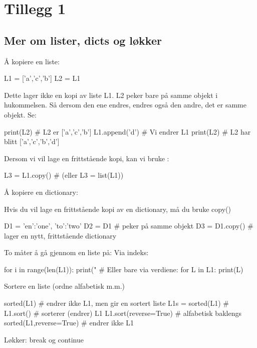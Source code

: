 \chapter{Tillegg 1}

\section{Mer om lister, dicts og løkker}

Å kopiere en liste:

\begin{usncodebox}
L1 = ['a','c','b']
L2 = L1
\end{usncodebox}

Dette lager ikke en kopi av liste L1. L2 peker bare på samme objekt i hukommelsen. Så dersom den ene endres, endres også den andre, det er samme objekt. Se:
\begin{usncodebox} 
print(L2)       # L2 er ['a','c','b']
L1.append('d')  # Vi endrer L1
print(L2)       # L2 har blitt ['a','c','b','d']
\end{usncodebox}

Dersom vi vil lage en frittstående kopi, kan vi bruke :
\begin{usncodebox}
L3 = L1.copy() # (eller L3 = list(L1))
\end{usncodebox}

Å kopiere en dictionary: 

Hvis du vil lage en frittstående kopi av en dictionary, må du bruke copy()
\begin{usncodebox}
D1 = {'en':'one', 'to':'two'}
D2 = D1           # peker på samme objekt
D3 = D1.copy()    # lager en nytt, frittstående dictionary
\end{usncodebox}

To måter å gå gjennom en liste på: 
Via indeks:
\begin{usncodebox}
for i in range(len(L1)):
    print("%
# Eller bare via verdiene: 
for L in L1:
    print(L) 
\end{usncodebox}

Sortere en liste (ordne alfabetisk m.m.)
\begin{usncodebox}
sorted(L1)               # endrer ikke L1, men gir en sortert liste 
L1s = sorted(L1)         # 
L1.sort()                # sorterer (endrer) L1
L1.sort(reverse=True)    # alfabetisk baklengs
sorted(L1,reverse=True)  # endrer ikke L1
\end{usncodebox}

Løkker: break og continue 

